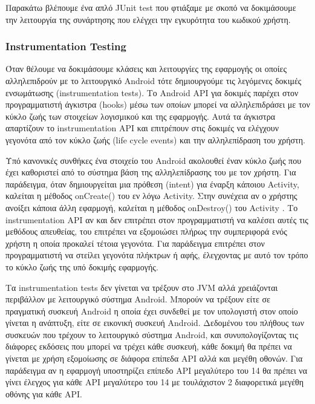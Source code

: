 		Παρακάτω βλέπουμε ένα απλό JUnit test που φτιάξαμε με σκοπό να δοκιμάσουμε την λειτουργία της συνάρτησης που ελέγχει την εγκυρότητα του κωδικού χρήστη.
		  
		\subsubsection{Instrumentation Testing}\label{sssec:instrumentation_testing}
		Όταν θέλουμε να δοκιμάσουμε κλάσεις και λειτουργίες της εφαρμογής οι οποίες αλληλεπιδρούν με το λειτουργικό Android τότε δημιουργούμε τις λεγόμενες δοκιμές ενσωμάτωσης (instrumentation tests). Το Android API για δοκιμές παρέχει στον προγραμματιστή άγκιστρα (hooks) μέσω των οποίων μπορεί να αλληλεπιδράσει με τον κύκλο ζωής των στοιχείων λογισμικού και της εφαρμογής. Αυτά τα άγκιστρα απαρτίζουν το instrumentation API και επιτρέπουν στις δοκιμές να ελέγχουν γεγονότα από τον κύκλο ζωής (life cycle events) και την αλληλεπίδραση του χρήστη.

		Υπό κανονικές συνθήκες ένα στοιχείο του Android ακολουθεί έναν κύκλο ζωής που έχει καθοριστεί από το σύστημα βάση της αλληλεπίδρασης του με τον χρήστη. Για παράδειγμα, όταν δημιουργείται μια πρόθεση (intent) για έναρξη κάποιου Activity, καλείται η μέθοδος onCreate() του εν λόγω Activity. Στην συνέχεια αν ο χρήστης ανοίξει κάποια άλλη εφαρμογή, καλείται η μέθοδος onDestroy() του Activity . Το instrumentation API αν και δεν επιτρέπει στον προγραμματιστή να καλέσει αυτές τις μεθόδους απευθείας, του επιτρέπει να εξομοιώσει πλήρως την συμπεριφορά ενός χρήστη η οποία προκαλεί τέτοια γεγονότα. Για παράδειγμα επιτρέπει στον προγραμματιστή να στείλει γεγονότα πλήκτρων ή αφής, έλεγχοντας με αυτό τον τρόπο το κύκλο ζωής της υπό δοκιμής εφαρμογής\cite{androidTestingBook}.

		Τα instrumentation tests δεν γίνεται να τρέξουν στο JVM αλλά χρειάζονται περιβάλλον με λειτουργικό σύστημα Android. Μπορούν να τρέξουν είτε σε πραγματική συσκευή Android η οποία έχει συνδεθεί με τον υπολογιστή στον οποίο γίνεται η ανάπτυξη, είτε σε εικονική συσκευή Android. Δεδομένου του πλήθους των συσκευών που τρέχουν το λειτουργικό σύστημα Android, και συνυπολογίζοντας τις διάφορες εκδόσεις που μπορεί να τρέχει κάθε συσκευή, κάθε δοκιμή θα πρέπει να γίνεται με χρήση εξομοίωσης σε διάφορα επίπεδα API αλλά και μεγέθη οθονών. Για παράδειγμα αν η εφαρμογή υποστηρίζει επίπεδο API μεγαλύτερο του 14 θα πρέπει να γίνει έλεγχος για κάθε API μεγαλύτερο του 14 με τουλάχιστον 2 διαφορετικά μεγέθη οθόνης για κάθε API. 
		
